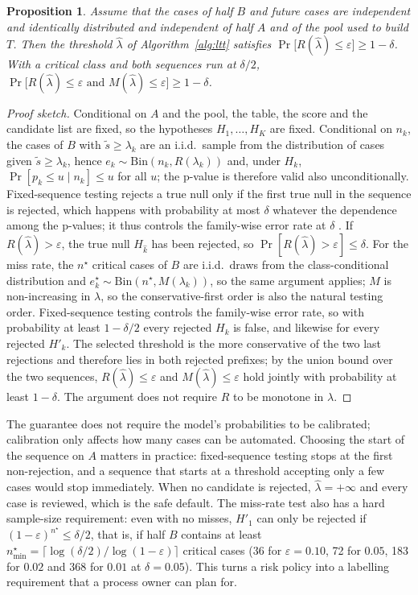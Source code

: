 \documentclass[a4paper,fleqn]{cas-sc}
\newtheorem{proposition}{Proposition}
\theoremstyle{definition}
\begin{document}
\begin{proposition}\label{prop:ltt}
Assume that the cases of half $B$ and future cases are independent and identically distributed and independent of half $A$ and of the pool used to build $T$. Then the threshold $\hat\lambda$ of Algorithm~\ref{alg:ltt} satisfies $\Pr\big[R(\hat\lambda)\le\varepsilon\big]\ge 1-\delta$. With a critical class and both sequences run at $\delta/2$, $\Pr\big[R(\hat\lambda)\le\varepsilon \text{ and } M(\hat\lambda)\le\varepsilon\big]\ge 1-\delta$.
\end{proposition}

\begin{proof}[Proof sketch]
Conditional on $A$ and the pool, the table, the score and the candidate list are fixed, so the hypotheses $H_1,\dots,H_K$ are fixed. Conditional on $n_k$, the cases of $B$ with $\tilde s\ge\lambda_k$ are an i.i.d.\ sample from the distribution of cases given $\tilde s\ge\lambda_k$, hence $e_k\sim\mathrm{Bin}(n_k,R(\lambda_k))$ and, under $H_k$, $\Pr[p_k\le u\mid n_k]\le u$ for all $u$; the p-value is therefore valid also unconditionally. Fixed-sequence testing rejects a true null only if the first true null in the sequence is rejected, which happens with probability at most $\delta$ whatever the dependence among the p-values; it thus controls the family-wise error rate at $\delta$ \citep{angelopoulos2025ltt}. If $R(\hat\lambda)>\varepsilon$, the true null $H_{\hat k}$ has been rejected, so $\Pr[R(\hat\lambda)>\varepsilon]\le\delta$. For the miss rate, the $n^\star$ critical cases of $B$ are i.i.d.\ draws from the class-conditional distribution and $e^\star_k\sim\mathrm{Bin}(n^\star,M(\lambda_k))$, so the same argument applies; $M$ is non-increasing in $\lambda$, so the conservative-first order is also the natural testing order. Fixed-sequence testing controls the family-wise error rate, so with probability at least $1-\delta/2$ every rejected $H_k$ is false, and likewise for every rejected $H'_k$. The selected threshold is the more conservative of the two last rejections and therefore lies in both rejected prefixes; by the union bound over the two sequences, $R(\hat\lambda)\le\varepsilon$ and $M(\hat\lambda)\le\varepsilon$ hold jointly with probability at least $1-\delta$. The argument does not require $R$ to be monotone in $\lambda$.
\end{proof}

The guarantee does not require the model's probabilities to be calibrated; calibration only affects how many cases can be automated. Choosing the start of the sequence on $A$ matters in practice: fixed-sequence testing stops at the first non-rejection, and a sequence that starts at a threshold accepting only a few cases would stop immediately. When no candidate is rejected, $\hat\lambda=+\infty$ and every case is reviewed, which is the safe default. The miss-rate test also has a hard sample-size requirement: even with no misses, $H'_1$ can only be rejected if $(1-\varepsilon)^{n^\star}\le\delta/2$, that is, if half $B$ contains at least $n^\star_{\min}=\lceil\log(\delta/2)/\log(1-\varepsilon)\rceil$ critical cases (36 for $\varepsilon=0.10$, 72 for $0.05$, 183 for $0.02$ and 368 for $0.01$ at $\delta=0.05$). This turns a risk policy into a labelling requirement that a process owner can plan for.
\end{document}
